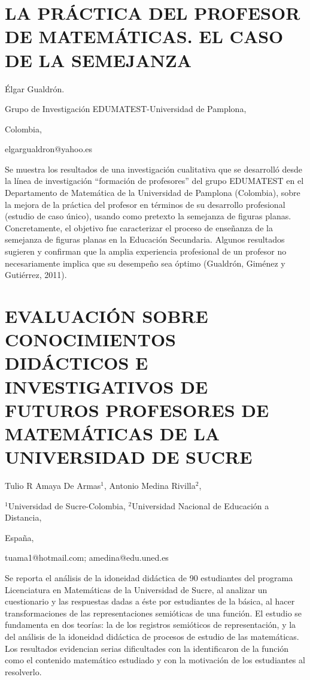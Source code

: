 \section{LA PRÁCTICA DEL PROFESOR DE MATEMÁTICAS. EL CASO DE LA SEMEJANZA}

\begin{datos}

Élgar Gualdrón.

Grupo de Investigación EDUMATEST-Universidad de Pamplona,

Colombia,

elgargualdron@yahoo.es 

\end{datos}

Se muestra los resultados de una investigación cualitativa que se
desarrolló desde la línea de investigación “formación de profesores”
del grupo EDUMATEST en el Departamento de Matemática de la Universidad
de Pamplona (Colombia), sobre la mejora de la práctica del profesor
en términos de su desarrollo profesional (estudio de caso único),
usando como pretexto la semejanza de figuras planas. Concretamente,
el objetivo fue caracterizar el proceso de enseñanza de la semejanza
de figuras planas en la Educación Secundaria. Algunos resultados sugieren
y confirman que la amplia experiencia profesional de un profesor no
necesariamente implica que su desempeño sea óptimo (Gualdrón, Giménez
y Gutiérrez, 2011).


\section{EVALUACIÓN SOBRE CONOCIMIENTOS DIDÁCTICOS E INVESTIGATIVOS DE FUTUROS
PROFESORES DE MATEMÁTICAS DE LA UNIVERSIDAD DE SUCRE}

\begin{datos}

Tulio R Amaya De Armas$^{1}$, Antonio Medina Rivilla$^{2}$,

$^{1}$Universidad de Sucre-Colombia, $^{2}$Universidad Nacional
de Educación a Distancia,

España,

tuama1@hotmail.com; amedina@edu.uned.es 

\end{datos}

Se reporta el análisis de la idoneidad didáctica de 90 estudiantes
del programa Licenciatura en Matemáticas de la Universidad de Sucre,
al analizar un cuestionario y las respuestas dadas a éste por estudiantes
de la básica, al hacer transformaciones de las representaciones semióticas
de una función. El estudio se fundamenta en dos teorías: la de los
registros semióticos de representación, y la del análisis de la idoneidad
didáctica de procesos de estudio de las matemáticas. Los resultados
evidencian serias dificultades con la identificaron de la función
como el contenido matemático estudiado y con la motivación de los
estudiantes al resolverlo. 


